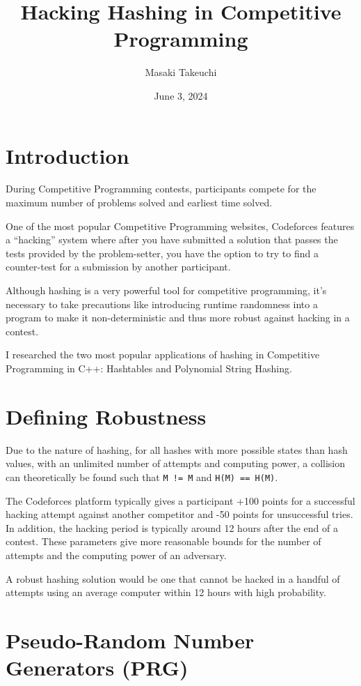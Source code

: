 \documentclass[12pt,a4paper]{article}
\title{Hacking Hashing in Competitive Programming}
\author{Masaki Takeuchi}
\date{June 3, 2024}
\begin{document}
\maketitle
\section{Introduction}\label{introduction}

During Competitive Programming contests, participants compete for the
maximum number of problems solved and earliest time solved.

One of the most popular Competitive Programming websites, Codeforces
features a ``hacking'' system where after you have submitted a solution
that passes the tests provided by the problem-setter, you have the
option to try to find a counter-test for a submission by another
participant.

Although hashing is a very powerful tool for competitive programming,
it's necessary to take precautions like introducing runtime randomness
into a program to make it non-deterministic and thus more robust against
hacking in a contest.

I researched the two most popular applications of hashing in Competitive
Programming in C++: Hashtables and Polynomial String Hashing.

\section{Defining Robustness}\label{defining-robustness}

Due to the nature of hashing, for all hashes with more possible states
than hash values, with an unlimited number of attempts and computing
power, a collision can theoretically be found such that
\texttt{M\ !=\ M\textquotesingle{}} and
\texttt{H(M)\ ==\ H(M\textquotesingle{})}.

The Codeforces platform typically gives a participant +100 points for a
successful hacking attempt against another competitor and -50 points for
unsuccessful tries. In addition, the hacking period is typically around
12 hours after the end of a contest. These parameters give more
reasonable bounds for the number of attempts and the computing power of
an adversary.

A robust hashing solution would be one that cannot be hacked in a
handful of attempts using an average computer within 12 hours with high
probability.

\section{Pseudo-Random Number Generators
  (PRG)}\label{pseudo-random-number-generators-prg}
\end{document}
